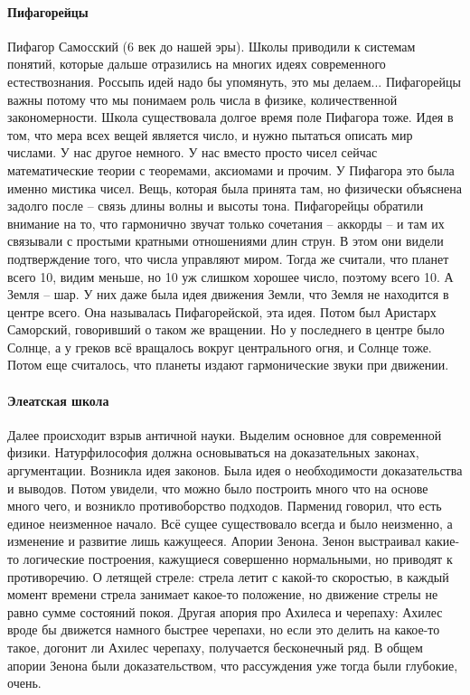 \documentclass[a4paper, 12pt]{article}
\begin{document}
\paragraph{Пифагорейцы}
Пифагор Самосский (6 век до нашей эры). Школы приводили к системам 
понятий, которые дальше отразились на многих идеях современного 
естествознания. Россыпь идей надо бы упомянуть, это мы делаем... 
Пифагорейцы важны потому что мы понимаем роль числа в физике, 
количественной закономерности. Школа существовала долгое время поле 
Пифагора тоже. Идея в том, что мера всех вещей является число, и нужно 
пытаться описать мир числами. У нас другое немного. У нас вместо просто 
чисел сейчас математические теории с теоремами, аксиомами и прочим. 
У Пифагора это была именно мистика чисел. Вещь, которая была принята 
там, но физически объяснена задолго после -- связь длины волны и высоты 
тона. Пифагорейцы обратили внимание на то, что гармонично звучат только 
сочетания -- аккорды -- и там их связывали с простыми кратными 
отношениями длин струн. В этом они видели подтверждение того, что числа 
управляют миром. Тогда же считали, что планет всего 10, видим меньше, но 
10 уж слишком хорошее число, поэтому всего 10. А Земля -- шар. У них 
даже была идея движения Земли, что Земля не находится в центре всего. 
Она называлась Пифагорейской, эта идея. Потом был Аристарх Саморский, 
говоривший о таком же вращении. Но у последнего в центре было Солнце, 
а у греков всё вращалось вокруг центрального огня, и Солнце тоже. Потом 
еще считалось, что планеты издают гармонические звуки при движении.

\paragraph{Элеатская школа}
Далее происходит взрыв античной науки. Выделим основное для современной 
физики. Натурфилософия должна основываться на доказательных законах, 
аргументации. Возникла идея законов. Была идея о необходимости 
доказательства и выводов. Потом увидели, что можно было построить много 
что на основе много чего, и возникло противоборство подходов. Парменид 
говорил, что есть единое неизменное начало. Всё сущее существовало 
всегда и было неизменно, а изменение и развитие лишь кажущееся. Апории 
Зенона. Зенон выстраивал какие-то логические построения, кажущиеся 
совершенно нормальными, но приводят к противоречию. О летящей стреле: 
стрела летит с какой-то скоростью, в каждый момент времени стрела 
занимает какое-то положение, но движение стрелы не равно сумме состояний 
покоя. Другая апория про Ахилеса и черепаху: Ахилес вроде бы движется 
намного быстрее черепахи, но если это делить на какое-то такое, догонит 
ли Ахилес черепаху, получается бесконечный ряд. В общем апории Зенона 
были доказательством, что рассуждения уже тогда были глубокие, очень.
\end{document}
